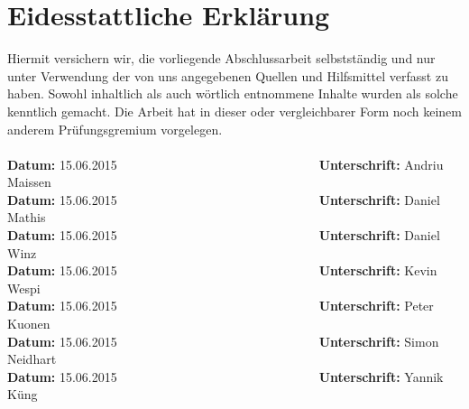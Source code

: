 \section*{Eidesstattliche Erklärung}
\label{erklaerung}
Hiermit versichern wir, die vorliegende Abschlussarbeit selbstständig und nur 
unter Verwendung der von uns angegebenen Quellen und Hilfsmittel verfasst zu 
haben. Sowohl inhaltlich als auch wörtlich entnommene Inhalte wurden als 
solche kenntlich gemacht. Die Arbeit hat in dieser oder vergleichbarer Form 
noch keinem anderem Prüfungsgremium vorgelegen. \\
\newcommand{\signdate}{15.06.2015}
\\[1.5cm]
\textbf{Datum:}	\signdate~~~~~~~~~~~~~~~~~~~~~~~~~~~~~~~~\textbf{Unterschrift:} Andriu Maissen
\\[1.5cm]
\textbf{Datum:}	\signdate~~~~~~~~~~~~~~~~~~~~~~~~~~~~~~~~\textbf{Unterschrift:} Daniel Mathis
\\[1.5cm]
\textbf{Datum:}	\signdate~~~~~~~~~~~~~~~~~~~~~~~~~~~~~~~~\textbf{Unterschrift:} Daniel Winz
\\[1.5cm]
\textbf{Datum:}	\signdate~~~~~~~~~~~~~~~~~~~~~~~~~~~~~~~~\textbf{Unterschrift:} Kevin Wespi
\\[1.5cm]
\textbf{Datum:}	\signdate~~~~~~~~~~~~~~~~~~~~~~~~~~~~~~~~\textbf{Unterschrift:} Peter Kuonen
\\[1.5cm]
\textbf{Datum:}	\signdate~~~~~~~~~~~~~~~~~~~~~~~~~~~~~~~~\textbf{Unterschrift:} Simon Neidhart
\\[1.5cm]
\textbf{Datum:}	\signdate~~~~~~~~~~~~~~~~~~~~~~~~~~~~~~~~\textbf{Unterschrift:} Yannik Küng
